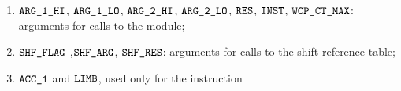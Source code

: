 \begin{enumerate}
	\item $\argOneHi$, $\argOneLo$, $\argTwoHi$, $\argTwoLo$, $\res$, $\INST$, $\wcpCtMax$:
	arguments for calls to the \wcpMod{} module;
    \item $\shfFlag$ ,$\shfArg$, $\shfRes$:
	arguments for calls to the shift reference table;
	\item $\acc 1$ and $\limb$,  used only for the  instruction
\end{enumerate}
